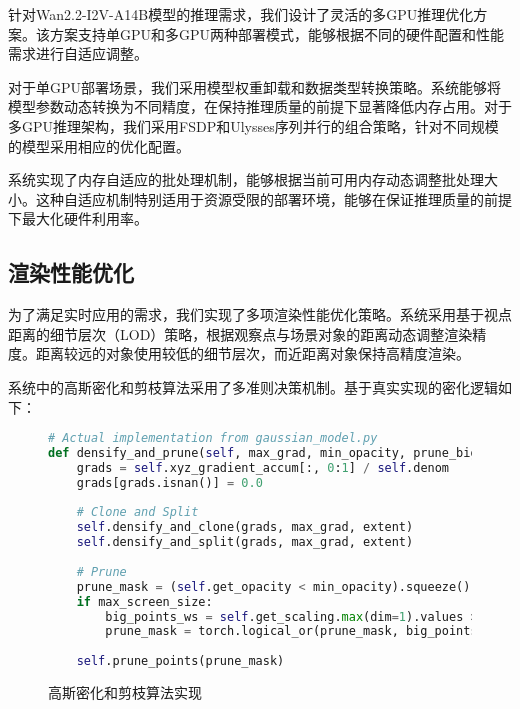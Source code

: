 针对Wan2.2-I2V-A14B模型的推理需求，我们设计了灵活的多GPU推理优化方案。该方案支持单GPU和多GPU两种部署模式，能够根据不同的硬件配置和性能需求进行自适应调整。

对于单GPU部署场景，我们采用模型权重卸载和数据类型转换策略。系统能够将模型参数动态转换为不同精度，在保持推理质量的前提下显著降低内存占用。对于多GPU推理架构，我们采用FSDP和Ulysses序列并行的组合策略，针对不同规模的模型采用相应的优化配置。

系统实现了内存自适应的批处理机制，能够根据当前可用内存动态调整批处理大小。这种自适应机制特别适用于资源受限的部署环境，能够在保证推理质量的前提下最大化硬件利用率。

\subsection{渲染性能优化}

为了满足实时应用的需求，我们实现了多项渲染性能优化策略。系统采用基于视点距离的细节层次（LOD）策略，根据观察点与场景对象的距离动态调整渲染精度。距离较远的对象使用较低的细节层次，而近距离对象保持高精度渲染。

系统中的高斯密化和剪枝算法采用了多准则决策机制。基于真实实现的密化逻辑如下：

\begin{figure}[!b]
  \begin{tmpbox}
    \begin{lstlisting}[language=Python]
# Actual implementation from gaussian_model.py
def densify_and_prune(self, max_grad, min_opacity, prune_big_points, extent, max_screen_size):
    grads = self.xyz_gradient_accum[:, 0:1] / self.denom
    grads[grads.isnan()] = 0.0
    
    # Clone and Split
    self.densify_and_clone(grads, max_grad, extent)
    self.densify_and_split(grads, max_grad, extent)
    
    # Prune
    prune_mask = (self.get_opacity < min_opacity).squeeze()
    if max_screen_size:
        big_points_ws = self.get_scaling.max(dim=1).values > extent * self.percent_big_ws
        prune_mask = torch.logical_or(prune_mask, big_points_ws)
    
    self.prune_points(prune_mask)
\end{lstlisting}
  \end{tmpbox}
  \caption{高斯密化和剪枝算法实现}
  \label{fig:gaussian-densify}
\end{figure}

